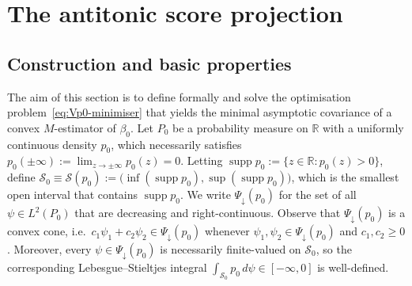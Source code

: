 \documentclass[a4paper]{article}
\newcommand{\R}{\mathbb{R}}
\DeclareMathOperator{\supp}{supp}
\theoremstyle{definition}
\begin{document}
\section{The antitonic score projection}
\label{sec:antitonic-proj}

\subsection{Construction and basic properties}
\label{subsec:antitonic-score-proj}

The aim of this section is to define formally and solve the optimisation problem~\eqref{eq:Vp0-minimiser} that yields the minimal asymptotic covariance of a convex $M$-estimator of $\beta_0$. Let $P_0$ be a probability measure on $\R$ with a uniformly continuous density $p_0$, which necessarily satisfies $p_0(\pm\infty) := \lim_{z \to \pm\infty}p_0(z) = 0$. 
Letting $\supp p_0 := \{z \in \R : p_0(z) > 0\}$, define $\mathcal{S}_0 \equiv \mathcal{S}(p_0) := \bigl(\inf(\supp p_0), \sup(\supp p_0)\bigr)$, which is the smallest open interval that contains $\supp p_0$. We write $\Psi_\downarrow(p_0)$ for the set of all $\psi \in L^2(P_0)$ that are decreasing and right-continuous. Observe that $\Psi_\downarrow(p_0)$ is a convex cone, i.e.~$c_1\psi_1 + c_2\psi_2 \in \Psi_\downarrow(p_0)$ whenever $\psi_1,\psi_2 \in \Psi_\downarrow(p_0)$ and $c_1,c_2 \geq 0$. Moreover, every $\psi \in \Psi_\downarrow(p_0)$ is necessarily finite-valued on $\mathcal{S}_0$, so the corresponding Lebesgue--Stieltjes integral $\int_{\mathcal{S}_0}p_0\,d\psi \in [-\infty,0]$ is well-defined. 
\end{document}
